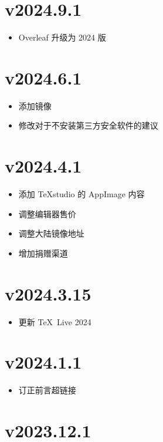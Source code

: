 \section*{v2024.9.1}

\begin{itemize}
  \item Overleaf 升级为 2024 版
\end{itemize}

\section*{v2024.6.1}

\begin{itemize}
  \item 添加镜像
  \item 修改对于不安装第三方安全软件的建议
\end{itemize}

\section*{v2024.4.1}

\begin{itemize}
  \item 添加 \TeX studio 的 AppImage 内容
  \item 调整编辑器售价
  \item 调整大陆镜像地址
  \item 增加捐赠渠道
\end{itemize}

\section*{v2024.3.15}

\begin{itemize}
  \item 更新 \TeX~Live 2024
\end{itemize}

\section*{v2024.1.1}

\begin{itemize}
  \item 订正前言超链接
\end{itemize}

\section*{v2023.12.1}

